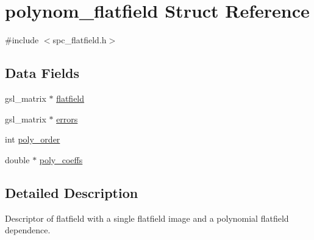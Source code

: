 \hypertarget{structpolynom__flatfield}{
\section{polynom\_\-flatfield Struct Reference}
\label{structpolynom__flatfield}
}


{\ttfamily \#include $<$spc\_\-flatfield.h$>$}\subsection*{Data Fields}
\begin{DoxyCompactItemize}
\item 
gsl\_\-matrix $\ast$ \hyperlink{structpolynom__flatfield_a489ee68b385052b07372fa0ae768106c}{flatfield}
\item 
gsl\_\-matrix $\ast$ \hyperlink{structpolynom__flatfield_a7cb096f2701bd64b8f57d27aef51e8ce}{errors}
\item 
int \hyperlink{structpolynom__flatfield_adb6281055bfa0626320e1c79ca284a77}{poly\_\-order}
\item 
double $\ast$ \hyperlink{structpolynom__flatfield_a1c036a8e0217763384459507643a5f80}{poly\_\-coeffs}
\end{DoxyCompactItemize}


\subsection{Detailed Description}
Descriptor of flatfield with a single flatfield image and a polynomial flatfield dependence. 

